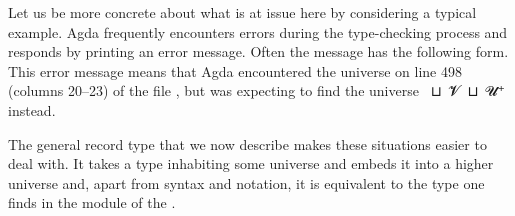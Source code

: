 Let us be more concrete about what is at issue here by considering a typical example. Agda frequently encounters errors during the type-checking process and responds by printing an error message. Often the message has the following form.
{\color{red}{\small
\begin{verbatim}
  Birkhoff.lagda:498,20-23
  𝓤 != 𝓞 ⊔ 𝓥 ⊔ (𝓤 ⁺) when checking that... has type...
\end{verbatim}}}
\noindent This error message means that Agda encountered the universe  on line 498 (columns 20--23) of the file , but was expecting to find the universe ~\aop ⊔~\ab 𝓥~\aop ⊔~\ab 𝓤\af ⁺ instead.


The general  record type that we now describe makes these situations easier to deal with. It takes a type inhabiting some universe and embeds it into a higher universe and, apart from syntax and notation, it is equivalent to the  type one finds in the  module of the \agdastdlib.
\ccpad
\begin{code}%
\>[0]\AgdaSpace{}%
\AgdaSpace{}%
\AgdaSymbol{\{}\AgdaSpace{}%
\AgdaSpace{}%
\AgdaSymbol{:}\AgdaSpace{}%
\AgdaSymbol{\}}\AgdaSpace{}%
\AgdaSymbol{(}\AgdaSpace{}%
\AgdaSymbol{:}\AgdaSpace{}%
\AgdaSpace{}%
\AgdaSymbol{)}\AgdaSpace{}%
\AgdaSymbol{:}\AgdaSpace{}%
\AgdaSpace{}%
\AgdaSpace{}%
\AgdaSpace{}%
%
\>[50]\<%
\\
\>[0][@{}l@{\AgdaIndent{0}}]%
\>[1]\AgdaSpace{}%
\<%
\\
%
\>[1]\AgdaSpace{}%
\AgdaSpace{}%
\AgdaSymbol{:}\AgdaSpace{}%
\<%
\\
\>[0]\AgdaSpace{}%
\<%
\end{code}
\scpad

